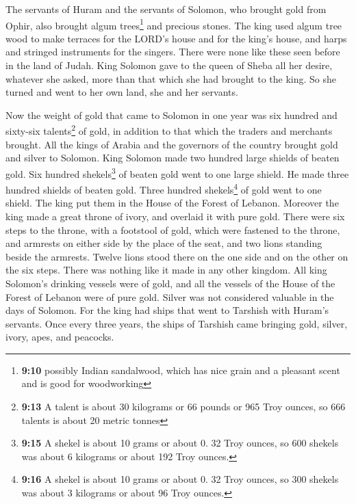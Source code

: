  The servants of Huram and the servants of Solomon, who
brought gold from Ophir, also brought algum trees\footnote{\textbf{9:10}
  possibly Indian sandalwood, which has nice grain and a pleasant scent
  and is good for woodworking} and precious stones.  The
king used algum tree wood to make terraces for the LORD's house and for
the king's house, and harps and stringed instruments for the singers.
There were none like these seen before in the land of Judah.
 King Solomon gave to the queen of Sheba all her desire,
whatever she asked, more than that which she had brought to the king. So
she turned and went to her own land, she and her servants.

 Now the weight of gold that came to Solomon in one year
was six hundred and sixty-six talents\footnote{\textbf{9:13} A talent is
  about 30 kilograms or 66 pounds or 965 Troy ounces, so 666 talents is
  about 20 metric tonnes} of gold,  in addition to that
which the traders and merchants brought. All the kings of Arabia and the
governors of the country brought gold and silver to Solomon.
 King Solomon made two hundred large shields of beaten
gold. Six hundred shekels\footnote{\textbf{9:15} A shekel is about 10
  grams or about 0. 32 Troy ounces, so 600 shekels was about 6 kilograms
  or about 192 Troy ounces.} of beaten gold went to one large shield.
 He made three hundred shields of beaten gold. Three
hundred shekels\footnote{\textbf{9:16} A shekel is about 10 grams or
  about 0. 32 Troy ounces, so 300 shekels was about 3 kilograms or about
  96 Troy ounces.} of gold went to one shield. The king put them in the
House of the Forest of Lebanon.  Moreover the king made a
great throne of ivory, and overlaid it with pure gold. 
There were six steps to the throne, with a footstool of gold, which were
fastened to the throne, and armrests on either side by the place of the
seat, and two lions standing beside the armrests.  Twelve
lions stood there on the one side and on the other on the six steps.
There was nothing like it made in any other kingdom.  All
king Solomon's drinking vessels were of gold, and all the vessels of the
House of the Forest of Lebanon were of pure gold. Silver was not
considered valuable in the days of Solomon.  For the king
had ships that went to Tarshish with Huram's servants. Once every three
years, the ships of Tarshish came bringing gold, silver, ivory, apes,
and peacocks.

